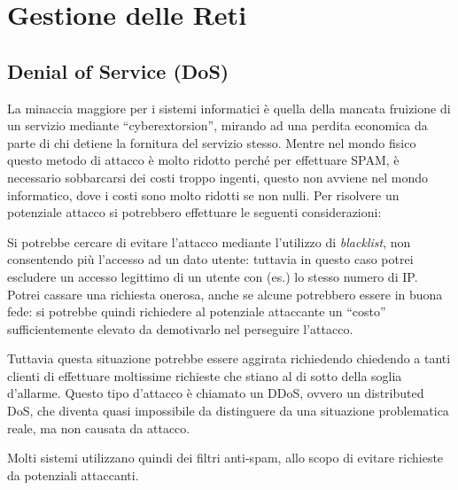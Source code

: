 \chapter{Gestione delle Reti}
\section{Denial of Service (DoS)}
La minaccia maggiore per i sistemi informatici è quella della mancata fruizione
di un servizio mediante ``cyberextorsion'', mirando ad una perdita economica
da parte di chi detiene la fornitura del servizio stesso. Mentre nel mondo
fisico questo metodo di attacco è molto ridotto perché per effettuare SPAM, è
necessario sobbarcarsi dei costi troppo ingenti, questo non avviene nel mondo
informatico, dove i costi sono molto ridotti se non nulli. Per risolvere un
potenziale attacco si potrebbero effettuare le seguenti considerazioni:
\begin{itemize}
\diam Si potrebbe cercare di evitare l'attacco mediante l'utilizzo di \textit{blacklist},
	non consentendo più l'accesso ad un dato utente: tuttavia in questo
	caso potrei escludere un accesso legittimo di un utente con (es.) lo
	stesso numero di IP.
\diam Potrei cassare una richiesta onerosa, anche se alcune potrebbero essere
	in buona fede: si potrebbe quindi richiedere al potenziale attaccante
	un ``costo'' sufficientemente elevato da demotivarlo nel perseguire
	l'attacco.
	
	Tuttavia questa situazione potrebbe essere aggirata
	richiedendo chiedendo a tanti clienti
	di effettuare moltissime richieste che stiano al di sotto della 
	soglia d'allarme. Questo tipo d'attacco è chiamato un DDoS, ovvero un
	distributed DoS, che diventa quasi impossibile da distinguere da una
	situazione problematica reale, ma non causata da attacco.
\end{itemize}
Molti sistemi utilizzano quindi dei filtri anti-spam, allo scopo di evitare
richieste da potenziali attaccanti.

